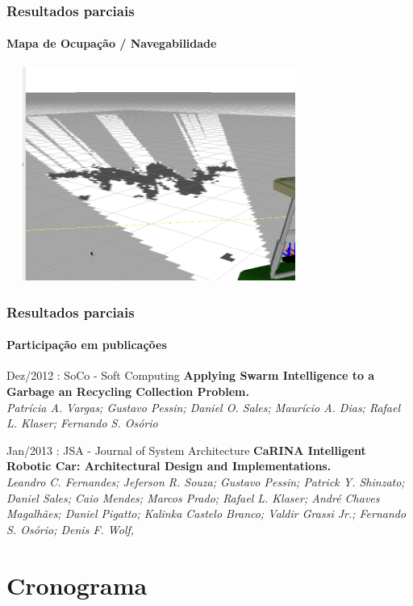 \documentclass[brazil]{beamer}
\begin{document}
\begin{frame}
\frametitle{Resultados parciais}
\framesubtitle{Mapa de Ocupação / Navegabilidade}
\includegraphics[width=10cm,height=7cm,]{../img/arq_mapa.png}
\end{frame}


\begin{frame}
\frametitle{Resultados parciais}
\framesubtitle{Participação em publicações}
\begin{block}{Dez/2012 : SoCo - Soft Computing}
\textbf{Applying Swarm Intelligence to a Garbage an Recycling Collection
Problem.}\\
\textit{Patrícia A. Vargas; Gustavo Pessin; Daniel O. Sales; Maurício A. Dias; Rafael L. Klaser;
Fernando S. Osório}
\end{block}

\begin{block}{Jan/2013 : JSA - Journal of System Architecture}
\textbf{CaRINA Intelligent Robotic Car: Architectural Design and
Implementations.}\\
\textit{Leandro C. Fernandes; Jeferson R. Souza; Gustavo Pessin; Patrick Y.
Shinzato; Daniel Sales; Caio Mendes; Marcos Prado; Rafael L. Klaser; André Chaves Magalhães; Daniel
Pigatto; Kalinka Castelo Branco; Valdir Grassi Jr.; Fernando S. Osório; Denis F. Wolf,}
\end{block}

\end{frame}




\section{Cronograma}
\end{document}
